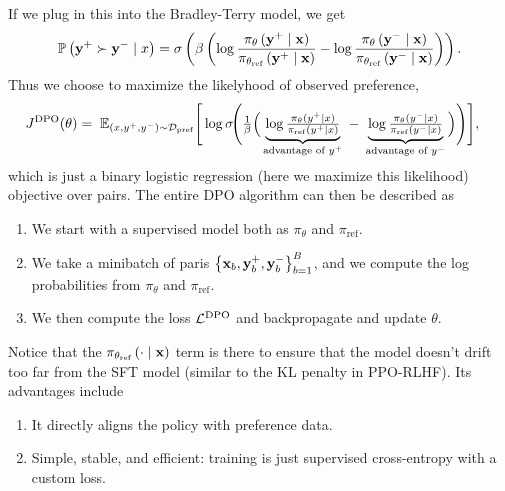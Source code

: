 \documentclass[11pt]{article}  %
\begin{document}
If we plug in this into the Bradley-Terry model, we get 
\begin{align*}
  \mathbb{P}\left( \mathbf{y}^{+} \succ \mathbf{y}^{-} \mid x \right) = \sigma\left( \beta\left( \log \frac{\pi_{\theta}\left( \mathbf{y}^+ \mid \mathbf{x} \right)}{\pi_{\theta_{\text{ref}}}\left( \mathbf{y}^+ \mid \mathbf{x} \right)} - \log \frac{\pi_{\theta}\left( \mathbf{y}^- \mid \mathbf{x} \right)}{\pi_{\theta_{\text{ref}}}\left( \mathbf{y}^- \mid \mathbf{x} \right)} \right) \right).
\end{align*}
Thus we choose to maximize the likelyhood of observed preference, 
\begin{align*}
  J^{\text{DPO}}(\theta)
  &= \; \mathbb{E}_{(x, y^+, y^-) \sim \mathcal{D}_{\text{pref}}}
     \Bigg[
        \log \sigma\!\Bigg(
         \tfrac{1}{\beta}\Big(
           \underbrace{\log \tfrac{\pi_\theta(y^+\mid x)}{\pi_{\mathrm{ref}}(y^+\mid x)}}_{\text{advantage of } y^+}
           \;-\;
           \underbrace{\log \tfrac{\pi_\theta(y^-\mid x)}{\pi_{\mathrm{ref}}(y^-\mid x)}}_{\text{advantage of } y^-}
         \Big)
       \Bigg)
     \Bigg],
\end{align*}
which is just a binary logistic regression (here we maximize this likelihood) objective over pairs.
The entire DPO algorithm can then be described as 
\begin{enumerate}
  \item We start with a supervised model both as $\pi_{\theta}$ and $\pi_{\text{ref}}$.
  \item We take a minibatch of paris $\left\{ \mathbf{x}_b, \mathbf{y}^+_b, \mathbf{y}^-_b \right\}_{b=1}^B$, and we compute the log probabilities from $\pi_\theta$ and $\pi_{\text{ref}}$.
  \item We then compute the loss $\mathcal{L}^{\text{DPO}}$ and backpropagate and update $\theta$.
\end{enumerate}
Notice that the $\pi_{\theta_{\text{ref}}}\left( \cdot \mid \mathbf{x} \right)$ term is there to ensure that the model doesn't drift too far from the SFT model (similar to the KL penalty in PPO-RLHF).
Its advantages include 
\begin{enumerate}
  \item It directly aligns the policy with preference data.
  \item Simple, stable, and efficient: training is just supervised cross-entropy with a custom loss.
\end{enumerate}
\end{document}
